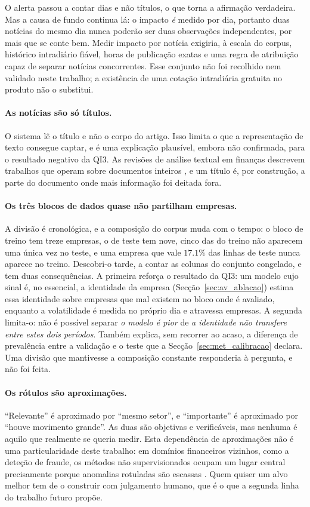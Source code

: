 O alerta passou a contar dias e não títulos, o que torna a afirmação verdadeira. Mas a causa de
fundo continua lá: o impacto \emph{é} medido por dia, portanto duas notícias do mesmo dia nunca
poderão ser duas observações independentes, por mais que se conte bem. Medir impacto por notícia
exigiria, à escala do corpus, histórico intradiário fiável, horas de publicação exatas e uma regra
de atribuição capaz de separar notícias concorrentes. Esse conjunto não foi recolhido nem validado
neste trabalho; a existência de uma cotação intradiária gratuita no produto não o substitui.

\paragraph{As notícias são só títulos.}
O sistema lê o título e não o corpo do artigo. Isso limita o que a representação de texto consegue
captar, e é uma explicação plausível, embora não confirmada, para o resultado negativo da QI3. As
revisões de análise textual em finanças descrevem trabalhos que operam sobre documentos inteiros
\autocite{kearney2014textual}, e um título é, por construção, a parte do documento onde mais
informação foi deitada fora.

\paragraph{Os três blocos de dados quase não partilham empresas.}
A divisão é cronológica, e a composição do corpus muda com o tempo: o bloco de treino tem treze
empresas, o de teste tem nove, cinco das do treino não aparecem uma única vez no teste, e uma
empresa que vale $17.1\%$ das linhas de teste nunca aparece no treino. Descobri-o tarde, a contar
as colunas do conjunto congelado, e tem duas consequências. A primeira reforça o resultado da
\gls{QI}3: um modelo cujo sinal é, no essencial, a identidade da empresa
(Secção~\ref{sec:av_ablacao}) estima essa identidade sobre empresas que mal existem no bloco onde é
avaliado, enquanto a volatilidade é medida no próprio dia e atravessa empresas. A segunda limita-o:
não é possível separar \emph{o modelo é pior} de \emph{a identidade não transfere entre estes dois
períodos}. Também explica, sem recorrer ao acaso, a diferença de prevalência entre a validação e o
teste que a Secção~\ref{sec:met_calibracao} declara. Uma divisão que mantivesse a composição
constante responderia à pergunta, e não foi feita.

\paragraph{Os rótulos são aproximações.}
``Relevante'' é aproximado por ``mesmo setor'', e ``importante'' é aproximado por ``houve movimento
grande''. As duas são objetivas e verificáveis, mas nenhuma é aquilo que realmente se queria medir.
Esta dependência de aproximações não é uma particularidade deste trabalho: em domínios
financeiros vizinhos, como a deteção de fraude, os métodos não supervisionados ocupam um lugar
central precisamente porque anomalias rotuladas são escassas \autocite{ahmed2016financial}. Quem quiser um alvo melhor tem de o construir com julgamento humano,
que é o que a segunda linha do trabalho futuro propõe.

